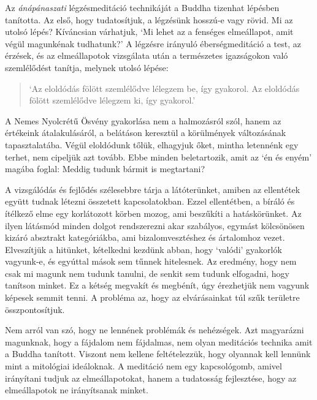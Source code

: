 Az \emph{ánápánaszati} légzésmeditáció technikáját a Buddha tizenhat
lépésben tanította. Az első, hogy tudatosítjuk, a légzésünk hosszú-e
vagy rövid. Mi az utolsó lépés? Kíváncsian várhatjuk, `Mi lehet az a
fenséges elmeállapot, amit végül magunkénak tudhatunk?' A légzésre
irányuló éberségmeditáció a test, az érzések, és az elmeállapotok
vizsgálata után a természetes igazságokon való szemlélődést tanítja,
melynek utolsó lépése:

\begin{quote}
`Az eloldódás fölött szemlélődve lélegzem be, így gyakorol. Az eloldódás
fölött szemlélődve lélegzem ki, így gyakorol.'

\bigskip

\end{quote}

A Nemes Nyolcrétű Ösvény gyakorlása nem a halmozásról szól, hanem az
értékeink átalakulásáról, a belátáson keresztül a körülmények
változásának tapasztalatába. Végül eloldódunk tőlük, elhagyjuk őket,
mintha letennénk egy terhet, nem cipeljük azt tovább. Ebbe minden
beletartozik, amit az `én és enyém' magába foglal: Meddig tudunk bármit
is megtartani?


A vizsgálódás és fejlődés szélesebbre tárja a látóterünket, amiben az
ellentétek együtt tudnak létezni összetett kapcsolatokban. Ezzel
ellentétben, a bíráló és ítélkező elme egy korlátozott körben mozog, ami
beszűkíti a hatáskörünket. Az ilyen látásmód minden dolgot rendszerezni
akar szabályos, egymást kölcsönösen kizáró absztrakt kategóriákba, ami
bizalomvesztéshez és ártalomhoz vezet. Elveszítjük a hitünket,
kételkedni kezdünk abban, hogy `valódi' gyakorlók vagyunk-e, és egyúttal
mások sem tűnnek hitelesnek. Az eredmény, hogy nem csak mi magunk nem
tudunk tanulni, de senkit sem tudunk elfogadni, hogy tanítson minket. Ez
a kétség megvakít és megbénít, úgy érezhetjük nem vagyunk képesek semmit
tenni. A probléma az, hogy az elvárásainkat túl szűk területre
összpontosítjuk.

Nem arról van szó, hogy ne lennének problémák és nehézségek. Azt
magyarázni magunknak, hogy a fájdalom nem fájdalmas, nem olyan
meditációs technika amit a Buddha tanított. Viszont nem kellene
feltételezzük, hogy olyannak kell lennünk mint a mitológiai ideáloknak.
A meditáció nem egy kapcsológomb, amivel irányítani tudjuk az
elmeállapotokat, hanem a tudatosság fejlesztése, hogy az elmeállapotok
ne irányítsanak minket.

